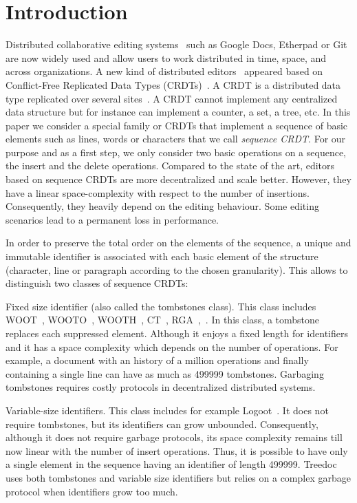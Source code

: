 \section{Introduction}

Distributed collaborative editing
systems~\cite{Ellis:1989:CCG:67544.66963,ellis1991groupware,greenberg1994real}
such as Google Docs, Etherpad or Git are now widely used and allow users to
work distributed in time, space, and across organizations. A new kind of
distributed editors~\cite{preguica2009commutative,weiss2007wooki} appeared
based on Conflict-Free Replicated Data Types
(CRDTs)~\cite{oster2006data,weiss2009logoot,shapiro2011conflict}. A CRDT is a
distributed data type replicated over several
sites~\cite{saito2005optimistic,saito2002replication}. A CRDT cannot implement
any centralized data structure but for instance can implement a counter, a set,
a tree, etc. In this paper we consider a special family or CRDTs that implement
a sequence of basic elements such as lines, words or characters that we call
\emph{sequence CRDT}. For our purpose and as a first step, we only consider two
basic operations on a sequence, the insert and the delete operations. Compared
to the state of the art, editors based on sequence CRDTs are more decentralized
and scale better. However, they have a linear space-complexity with respect to
the number of insertions. Consequently, they heavily depend on the editing
behaviour. Some editing scenarios lead to a permanent loss in performance.

In order to preserve the total order on the elements of the sequence, a unique
and immutable identifier is associated with each basic element of the structure
(character, line or paragraph according to the chosen granularity). This allows
to distinguish two classes of sequence CRDTs:
\begin{inparaenum}[(i)]
\item Fixed size identifier (also called the tombstones class). This class
  includes WOOT~\cite{oster2006data}, WOOTO~\cite{weiss2007wooki},
  WOOTH~\cite{ahmed2011evaluating}, CT~\cite{grishchenko2010deep},
  RGA~\cite{roh2011replicated},~\cite{Yu2012stringwise}. In this class, a
  tombstone replaces each suppressed element. Although it enjoys a fixed length
  for identifiers and it has a space complexity which depends on the number of
  operations. For example, a document with an history of a million operations
  and finally containing a single line can have as much as 499999
  tombstones. Garbaging tombstones requires costly protocols in decentralized
  distributed systems.
\item Variable-size identifiers. This class includes for example
  Logoot~\cite{weiss2009logoot}. It does not require tombstones, but its
  identifiers can grow unbounded. Consequently, although it does not require
  garbage protocols, its space complexity remains till now linear with the
  number of insert operations. Thus, it is possible to have only a single
  element in the sequence having an identifier of length
  499999. Treedoc~\cite{preguica2009commutative} uses both tombstones and
  variable size identifiers but relies on a complex garbage protocol when
  identifiers grow too much.
\end{inparaenum}


